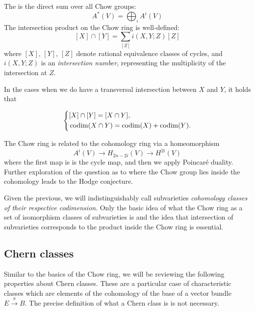 \documentclass[12pt]{memoir}
\begin{document}
The  is the direct sum over all Chow groups:
$$A^\ast(V) = \bigoplus_i A^i(V)$$
The intersection product on the Chow ring is well-defined:
$$[X] \cap [Y] = \sum_{[Z]} i(X, Y; Z) [Z]$$
where $[X]$, $[Y]$, $[Z]$ denote rational equivalence classes of cycles, and $i(X, Y; Z)$ is an \emph{intersection number}, representing the multiplicity of the intersection at $Z$.

\begin{Rmk}
In the cases when we do have a transversal intersection between $X$ and $Y$, it holds that 

$$
\left\lbrace
\begin{aligned}
&[X]\cap[Y]=[X\cap Y],\\
&\operatorname{codim}(X\cap Y)=\operatorname{codim}(X)+\operatorname{codim}(Y).
\end{aligned}
\right.
$$

\end{Rmk}

\begin{Rmk}
    The Chow ring is related to the cohomology ring via a homeomorphism 
    $$A^i(V)\to H_{2n-2i}(V)\to H^{2i}(V)$$
    where the first map is is the cycle map, and then we apply Poincaré duality. Further exploration of the question as to where the Chow group lies inside the cohomology leads to the Hodge conjecture.
\end{Rmk}

Given the previous, we will indistinguishably call subvarieties \emph{cohomology classes of their respective codimension}. Only the basic idea of what the Chow ring as a set of isomorphism classes of subvarieties is and the idea that intersection of subvarieties corresponds to the product inside the Chow ring is essential.

\subsection{Chern classes}

Similar to the basics of the Chow ring, we will be reviewing the following properties about Chern classes. These are a particular case of characteristic classes which are elements of the cohomology of the base of a vector bundle $E\xrightarrow[]{\pi}B$. The precise definition of what a Chern class is is not necessary. 
\end{document}
